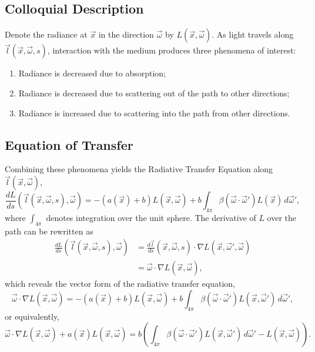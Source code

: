 \subsection{Colloquial Description}
Denote the radiance at $\vec{x}$ in the direction $\vec{\omega}$ by $L(\vec{x}, \vec{\omega})$.
As light travels along $\vec{l}(\vec{x}, \vec{\omega}, s)$, interaction with the
medium produces three phenomena of interest:
\begin{enumerate}
  \item Radiance is decreased due to absorption;
  \item Radiance is decreased due to scattering out of the path to other
    directions;
  \item Radiance is increased due to scattering into the path from other
      directions.
\end{enumerate}

\subsection{Equation of Transfer}
Combining these phenomena yields the Radiative Transfer Equation along
$\vec{l}(\vec{x}, \vec{\omega})$,
\begin{equation}
  \label{eqn:rte1d}
  \frac{dL}{ds}(\vec{l}(\vec{x}, \vec{\omega}, s), \vec{\omega})
  = -(a(\vec{x}) + b)L(\vec{x}, \vec{\omega})
  + b \int_{4\pi} \beta(\vec{\omega}\cdot\vec{\omega}') L(\vec{x})\, d\vec{\omega}',
\end{equation}
where $\int_{4\pi}$ denotes integration over the unit sphere.
The derivative of $L$ over the path can be rewritten as
\begin{align*}
  \frac{dL}{ds}(\vec{l}(\vec{x}, \vec{\omega}, s), \vec{\omega})
    &= \frac{d\vec{l}}{ds}(\vec{x}, \vec{\omega}, s) \cdot \nabla L(\vec{x}, \vec{\omega}', \vec{\omega}) \\
    &= \vec{\omega} \cdot \nabla L(\vec{x}, \vec{\omega}),
\end{align*}
which reveals the vector form of the radiative transfer equation,
\begin{equation*}
  \vec{\omega} \cdot \nabla L(\vec{x}, \vec{\omega})
  = -(a(\vec{x}) + b)L(\vec{x}, \vec{\omega})
  + b \int_{4\pi} \beta(\vec{\omega}\cdot\vec{\omega}') L(\vec{x}, \vec{\omega}')\, d\vec{\omega}',
\end{equation*}
or equivalently,
\begin{equation}
  \vec{\omega} \cdot \nabla L(\vec{x}, \vec{\omega})
  + a(\vec{x})L(\vec{x}, \vec{\omega})
  = b \left(
    \int_{4\pi} \beta(\vec{\omega}\cdot\vec{\omega}') L(\vec{x}, \vec{\omega}')\, d\vec{\omega}'
    - L(\vec{x}, \vec{\omega})
  \right).
  \label{eqn:rte}
\end{equation}


